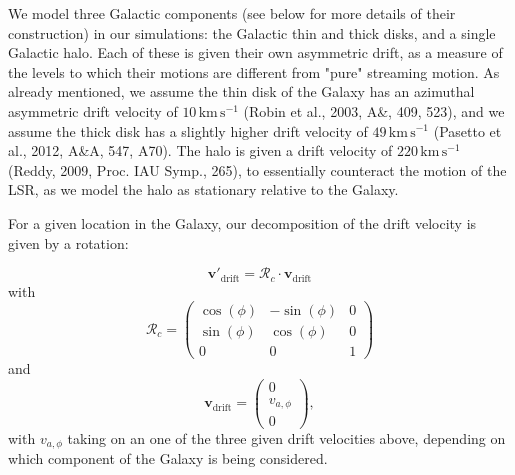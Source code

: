\documentclass[fleqn,usenatbib]{mnras}
\begin{document}
We model three Galactic components (see below for more details of their construction) in our simulations: the Galactic thin and thick disks, and a single Galactic halo. Each of these is given their own asymmetric drift, as a measure of the levels to which their motions are different from "pure" streaming motion. As already mentioned, we assume the thin disk of the Galaxy has an azimuthal asymmetric drift velocity of $10\,\mathrm{km}\,\mathrm{s}^{-1}$ (Robin et al., 2003, A\&, 409, 523), and we assume the thick disk has a slightly higher drift velocity of $49\,\mathrm{km}\,\mathrm{s}^{-1}$ (Pasetto et al., 2012, A\&A, 547, A70). The halo is given a drift velocity of $220\,\mathrm{km}\,\mathrm{s}^{-1}$ (Reddy, 2009, Proc. IAU Symp., 265), to essentially counteract the motion of the LSR, as we model the halo as stationary relative to the Galaxy.

For a given location in the Galaxy, our decomposition of the drift velocity is given by a rotation:

\begin{equation}
    \bm{v}{'}_\mathrm{\!\!drift} = \bm{\mathcal{R}}_c \cdot \bm{v}_\mathrm{drift}
\end{equation}
with
\begin{equation}
\bm{\mathcal{R}}_c = \left(\begin{matrix} \cos(\phi) & -\sin(\phi) & 0 \\ \sin(\phi) & \cos(\phi) & 0 \\ 0 & 0 & 1 \end{matrix}\right)
\label{eq:cylrot}
\end{equation}
and
\begin{equation}
\bm{v}_\mathrm{drift} = \left(\begin{matrix} 0 \\ v_{a,\phi} \\ 0 \end{matrix}\right),
\end{equation}
with $v_{a,\phi}$ taking on an one of the three given drift velocities above, depending on which component of the Galaxy is being considered.
\end{document}
